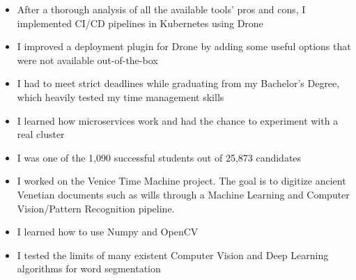 \documentclass[10pt,a4paper,ragged2e,withhyper]{altacv}
\begin{document}
\begin{paracol}{2}
\divider

\begin{itemize}
\item After a thorough analysis of all the available tools' pros and cons, I implemented CI/CD pipelines in Kubernetes using Drone
\item I improved a deployment plugin for Drone by adding some useful options that were not available out-of-the-box
\item I had to meet strict deadlines while graduating from my Bachelor's Degree, which heavily tested my time management skills
\item I learned how microservices work and had the chance to experiment with a real cluster
\item I was one of the 1,090 successful students out of 25,873 candidates   
\end{itemize}

\divider

\begin{itemize}
\item I worked on the Venice Time Machine project. The goal is to digitize ancient Venetian documents such as wills through a Machine Learning and Computer Vision/Pattern Recognition pipeline.
\item I learned how to use Numpy and OpenCV
\item I tested the limits of many existent Computer Vision and Deep Learning algorithms for word segmentation 
\end{itemize}



\nocite{*}



\printbibliography[heading=pubtype,title={\printinfo{\faFile*[regular]}{Journal Articles}}, type=article]




\end{paracol}
\end{document}
